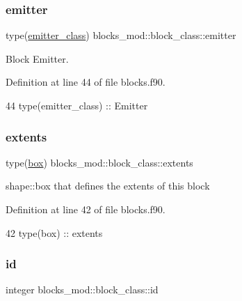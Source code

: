 \subsubsection{\texorpdfstring{emitter}{emitter}}
{\footnotesize\ttfamily type(\mbox{\hyperlink{structemitter__mod_1_1emitter__class}{emitter\+\_\+class}}) blocks\+\_\+mod\+::block\+\_\+class\+::emitter\hspace{0.3cm}{\ttfamily [private]}}



Block Emitter. 



Definition at line 44 of file blocks.\+f90.


\begin{DoxyCode}
44         \textcolor{keywordtype}{type}(emitter\_class)    :: Emitter
\end{DoxyCode}
\mbox{\label{structblocks__mod_1_1block__class_aff3b0cb7d8248f8a87691a028de916d3}} 
\subsubsection{\texorpdfstring{extents}{extents}}
{\footnotesize\ttfamily type(\mbox{\hyperlink{structgeometry__mod_1_1box}{box}}) blocks\+\_\+mod\+::block\+\_\+class\+::extents\hspace{0.3cm}{\ttfamily [private]}}



shape\+::box that defines the extents of this block 



Definition at line 42 of file blocks.\+f90.


\begin{DoxyCode}
42         \textcolor{keywordtype}{type}(box) :: extents
\end{DoxyCode}
\mbox{\label{structblocks__mod_1_1block__class_addd1a493d56aa1ffd1bc27c56b682065}} 
\subsubsection{\texorpdfstring{id}{id}}
{\footnotesize\ttfamily integer blocks\+\_\+mod\+::block\+\_\+class\+::id\hspace{0.3cm}{\ttfamily [private]}}



